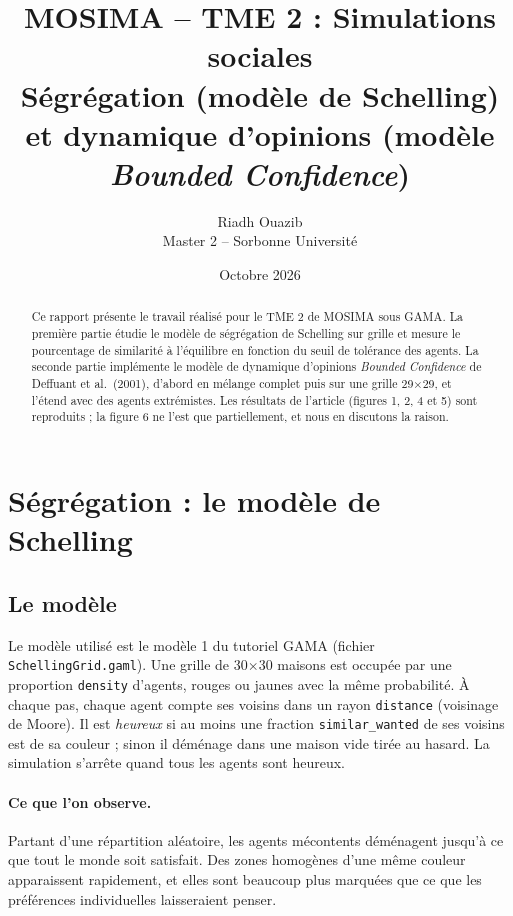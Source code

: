 \documentclass[11pt,a4paper]{article}
\title{\textbf{MOSIMA -- TME 2 : Simulations sociales}\\[4pt]
\large Ségrégation (modèle de Schelling) et dynamique d'opinions (modèle \textit{Bounded Confidence})}
\author{Riadh Ouazib\\ Master 2 -- Sorbonne Université}
\date{Octobre 2026}
\begin{document}
\maketitle

\begin{abstract}
Ce rapport présente le travail réalisé pour le TME 2 de MOSIMA sous GAMA.
La première partie étudie le modèle de ségrégation de Schelling sur grille et mesure le
pourcentage de similarité à l'équilibre en fonction du seuil de tolérance des agents.
La seconde partie implémente le modèle de dynamique d'opinions \textit{Bounded Confidence}
de Deffuant et al.\ (2001), d'abord en mélange complet puis sur une grille 29$\times$29,
et l'étend avec des agents extrémistes. Les résultats de l'article (figures 1, 2, 4 et 5)
sont reproduits ; la figure 6 ne l'est que partiellement, et nous en discutons la raison.
\end{abstract}

\tableofcontents
\newpage

\section{Ségrégation : le modèle de Schelling}

\subsection{Le modèle}

Le modèle utilisé est le modèle 1 du tutoriel GAMA (fichier \texttt{SchellingGrid.gaml}).
Une grille de 30$\times$30 maisons est occupée par une proportion \texttt{density} d'agents,
rouges ou jaunes avec la même probabilité. À chaque pas, chaque agent compte ses voisins
dans un rayon \texttt{distance} (voisinage de Moore). Il est \emph{heureux} si au moins une
fraction \texttt{similar\_wanted} de ses voisins est de sa couleur ; sinon il déménage dans
une maison vide tirée au hasard. La simulation s'arrête quand tous les agents sont heureux.

\paragraph{Ce que l'on observe.} Partant d'une répartition aléatoire, les agents mécontents
déménagent jusqu'à ce que tout le monde soit satisfait. Des zones homogènes d'une même couleur
apparaissent rapidement, et elles sont beaucoup plus marquées que ce que les préférences
individuelles laisseraient penser.
\end{document}
